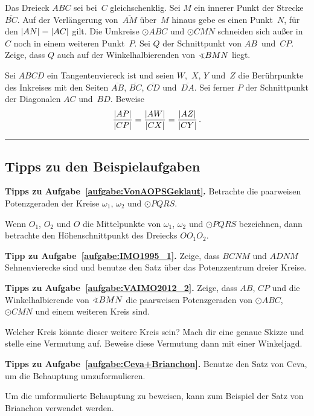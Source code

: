 \begin{aufgabe*}\label{aufgabe:VAIMO2012_2}
	Das Dreieck $ABC$ sei bei~$C$ gleichschenklig. Sei $M$ ein innerer Punkt der Strecke~$\overline{BC}$. Auf der Verlängerung von~$\overline{AM}$ über~$M$ hinaus gebe es einen Punkt~$N$, für den $\lvert AN\rvert=\lvert AC\rvert$ gilt. Die Umkreise $\odot ABC$ und $\odot CMN$ schneiden sich außer in~$C$ noch in einem weiteren Punkt~$P$. Sei $Q$ der Schnittpunkt von $AB$~und~$CP$. Zeige, dass $Q$ auch auf der Winkelhalbierenden von $\winkel BMN$ liegt.
\end{aufgabe*}

\begin{aufgabe*}\label{aufgabe:Ceva+Brianchon}
	Sei $ABCD$ ein Tangentenviereck ist und seien $W$,~$X$, $Y$ und~$Z$ die Berührpunkte des Inkreises mit den Seiten $\overline{AB}$, $\overline{BC}$, $\overline{CD}$ und~$\overline{DA}$. Sei ferner $P$ der Schnittpunkt der Diagonalen $AC$ und~$BD$. Beweise
	\begin{equation*}
		\frac{\lvert AP\rvert}{\lvert CP\rvert}=\frac{\lvert AW\rvert}{\lvert CX\rvert}=\frac{\lvert AZ\rvert}{\lvert CY\rvert}\,.
	\end{equation*}
\end{aufgabe*}

\phantom{newpage}\vfill\hrule\vspace{-1em}

\subsection*{Tipps zu den Beispielaufgaben}

\textbf{Tipps zu Aufgabe~\ref{aufgabe:VonAOPSGeklaut}.} Betrachte die paarweisen Potenzgeraden der Kreise $\omega_1$, $\omega_2$ und $\odot PQRS$.

Wenn $O_1$, $O_2$ und $O$ die Mittelpunkte von $\omega_1$, $\omega_2$ und $\odot PQRS$ bezeichnen, dann betrachte den Höhenschnittpunkt des Dreiecks $OO_1O_2$.

\textbf{Tipp zu Aufgabe~\ref{aufgabe:IMO1995_1}.} Zeige, dass $BCNM$ und $ADNM$ Sehnenvierecke sind und benutze den Satz über das Potenzzentrum dreier Kreise.

\textbf{Tipps zu Aufgabe~\ref{aufgabe:VAIMO2012_2}.} Zeige, dass $AB$, $CP$ und die Winkelhalbierende von $\winkel BMN$ die paarweisen Potenzgeraden von $\odot ABC$, $\odot CMN$ und einem weiteren Kreis sind.

Welcher Kreis könnte dieser weitere Kreis sein? Mach dir eine genaue Skizze und stelle eine Vermutung auf. Beweise diese Vermutung dann mit einer Winkeljagd.

\textbf{Tipps zu Aufgabe~\ref{aufgabe:Ceva+Brianchon}.} Benutze den Satz von Ceva, um die Behauptung umzuformulieren.

Um die umformulierte Behauptung zu beweisen, kann zum Beispiel der Satz von Brianchon verwendet werden.